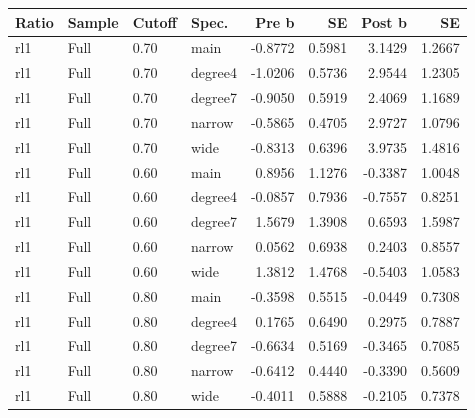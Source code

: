 \begin{threeparttable}
\begin{tabular}{llllrrrr}
\toprule
Ratio & Sample & Cutoff & Spec. & Pre b & SE & Post b & SE \\
\midrule
rl1 & Full & 0.70 & main & -0.8772 & 0.5981 & 3.1429 & 1.2667 \\
rl1 & Full & 0.70 & degree4 & -1.0206 & 0.5736 & 2.9544 & 1.2305 \\
rl1 & Full & 0.70 & degree7 & -0.9050 & 0.5919 & 2.4069 & 1.1689 \\
rl1 & Full & 0.70 & narrow & -0.5865 & 0.4705 & 2.9727 & 1.0796 \\
rl1 & Full & 0.70 & wide & -0.8313 & 0.6396 & 3.9735 & 1.4816 \\
rl1 & Full & 0.60 & main & 0.8956 & 1.1276 & -0.3387 & 1.0048 \\
rl1 & Full & 0.60 & degree4 & -0.0857 & 0.7936 & -0.7557 & 0.8251 \\
rl1 & Full & 0.60 & degree7 & 1.5679 & 1.3908 & 0.6593 & 1.5987 \\
rl1 & Full & 0.60 & narrow & 0.0562 & 0.6938 & 0.2403 & 0.8557 \\
rl1 & Full & 0.60 & wide & 1.3812 & 1.4768 & -0.5403 & 1.0583 \\
rl1 & Full & 0.80 & main & -0.3598 & 0.5515 & -0.0449 & 0.7308 \\
rl1 & Full & 0.80 & degree4 & 0.1765 & 0.6490 & 0.2975 & 0.7887 \\
rl1 & Full & 0.80 & degree7 & -0.6634 & 0.5169 & -0.3465 & 0.7085 \\
rl1 & Full & 0.80 & narrow & -0.6412 & 0.4440 & -0.3390 & 0.5609 \\
rl1 & Full & 0.80 & wide & -0.4011 & 0.5888 & -0.2105 & 0.7378 \\
\bottomrule
\end{tabular}
\end{threeparttable}
\par\medskip
